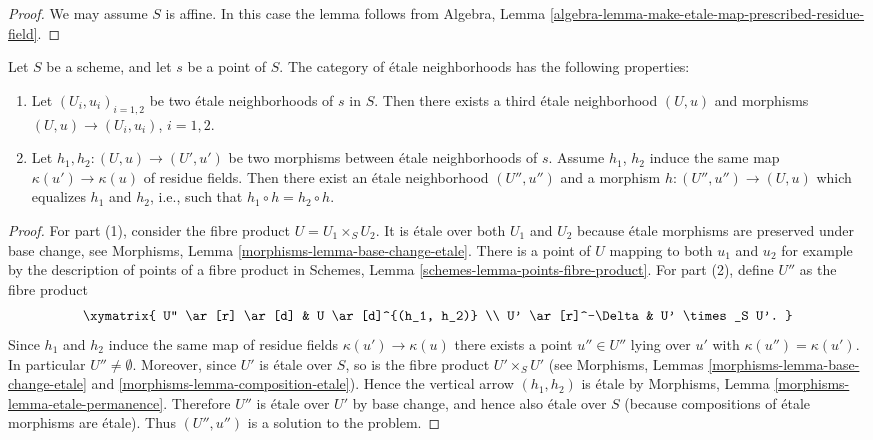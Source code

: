 \begin{proof}
We may assume $S$ is affine.
In this case the lemma follows from
Algebra, Lemma \ref{algebra-lemma-make-etale-map-prescribed-residue-field}.
\end{proof}

\begin{lemma}
\label{lemma-etale-neighbourhoods-not-quite-filtered}
Let $S$ be a scheme, and let $s$ be a point of $S$.
The category of \'etale neighborhoods has the following properties:
\begin{enumerate}
\item Let $(U_i, u_i)_{i=1, 2}$ be two \'etale neighborhoods of
$s$ in $S$. Then there exists a third \'etale neighborhood
$(U, u)$ and morphisms
$(U, u) \to (U_i, u_i)$, $i = 1, 2$.
\item Let $h_1, h_2: (U, u) \to (U', u')$ be two
morphisms between \'etale neighborhoods of $s$.
Assume $h_1$, $h_2$ induce the same map $\kappa(u') \to \kappa(u)$ of residue
fields. Then there exist an \'etale neighborhood $(U'', u'')$ and a morphism
$h : (U'', u'') \to (U, u)$
which equalizes $h_1$ and $h_2$, i.e., such that
$h_1 \circ h = h_2 \circ h$.
\end{enumerate}
\end{lemma}

\begin{proof}
For part (1), consider the fibre product $U = U_1 \times_S U_2$.
It is \'etale over both $U_1$ and $U_2$ because \'etale morphisms are
preserved under base change, see
Morphisms, Lemma \ref{morphisms-lemma-base-change-etale}.
There is a point of $U$ mapping to both $u_1$ and $u_2$ for example
by the description of points of a fibre product in
Schemes, Lemma \ref{schemes-lemma-points-fibre-product}.
For part (2), define $U''$ as the fibre product
$$
\xymatrix{
U'' \ar[r] \ar[d] & U \ar[d]^{(h_1, h_2)} \\
U' \ar[r]^-\Delta & U' \times_S U'.
}
$$
Since $h_1$ and $h_2$ induce the same map of residue fields
$\kappa(u') \to \kappa(u)$ there exists a point $u'' \in U''$
lying over $u'$ with $\kappa(u'') = \kappa(u')$.
In particular $U'' \not = \emptyset$.
Moreover, since $U'$ is \'etale over $S$, so is the fibre product
$U'\times_S U'$ (see
Morphisms, Lemmas \ref{morphisms-lemma-base-change-etale} and
\ref{morphisms-lemma-composition-etale}).
Hence the vertical arrow $(h_1, h_2)$ is \'etale by
Morphisms, Lemma \ref{morphisms-lemma-etale-permanence}.
Therefore $U''$ is \'etale over $U'$ by base change, and hence also
\'etale over $S$ (because compositions of \'etale morphisms are \'etale).
Thus $(U'', u'')$ is a solution to the problem.
\end{proof}

